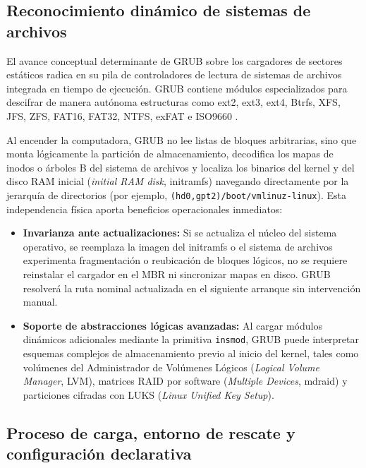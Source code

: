 \documentclass[12pt]{article}
\begin{document}
\subsection{Reconocimiento dinámico de sistemas de archivos}
\label{subsec:reconocimientoSistemasArchivosGrub}

El avance conceptual determinante de GRUB sobre los cargadores de sectores estáticos radica en su pila de controladores de lectura de sistemas de archivos integrada en tiempo de ejecución. GRUB contiene módulos especializados para descifrar de manera autónoma estructuras como ext2, ext3, ext4, Btrfs, XFS, JFS, ZFS, FAT16, FAT32, NTFS, exFAT e ISO9660 \parencite{gnugrub2024manual}.

Al encender la computadora, GRUB no lee listas de bloques arbitrarias, sino que monta lógicamente la partición de almacenamiento, decodifica los mapas de inodos o árboles B del sistema de archivos y localiza los binarios del kernel y del disco RAM inicial (\textit{initial RAM disk}, initramfs) navegando directamente por la jerarquía de directorios (por ejemplo, \texttt{(hd0,gpt2)/boot/vmlinuz-linux}). Esta independencia física aporta beneficios operacionales inmediatos:
\begin{itemize}[noitemsep, topsep=2pt]
    \item \textbf{Invarianza ante actualizaciones:} Si se actualiza el núcleo del sistema operativo, se reemplaza la imagen del initramfs o el sistema de archivos experimenta fragmentación o reubicación de bloques lógicos, no se requiere reinstalar el cargador en el MBR ni sincronizar mapas en disco. GRUB resolverá la ruta nominal actualizada en el siguiente arranque sin intervención manual.
    \item \textbf{Soporte de abstracciones lógicas avanzadas:} Al cargar módulos dinámicos adicionales mediante la primitiva \texttt{insmod}, GRUB puede interpretar esquemas complejos de almacenamiento previo al inicio del kernel, tales como volúmenes del Administrador de Volúmenes Lógicos (\textit{Logical Volume Manager}, LVM), matrices RAID por software (\textit{Multiple Devices}, mdraid) y particiones cifradas con LUKS (\textit{Linux Unified Key Setup}).
\end{itemize}

\subsection{Proceso de carga, entorno de rescate y configuración declarativa}
\label{subsec:procesoCargaGrub}
\end{document}
